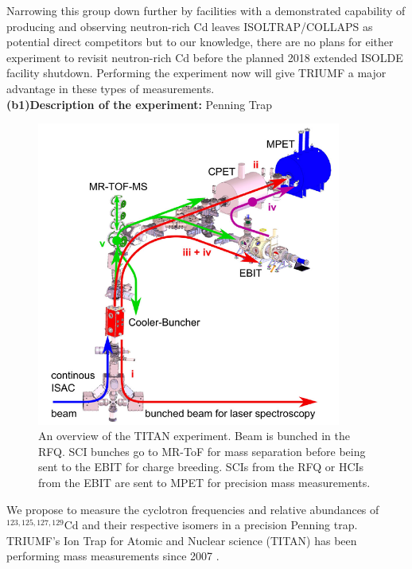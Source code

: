 \documentclass[12pt]{article}
\begin{document}
Narrowing this group down further by facilities with a demonstrated capability of producing and observing neutron-rich Cd leaves ISOLTRAP/COLLAPS as potential direct competitors but to our knowledge, there are no plans for either experiment to revisit neutron-rich Cd before the planned 2018 extended ISOLDE facility shutdown. Performing the experiment now will give TRIUMF a major advantage in these types of measurements.\\

\noindent\textbf{(b1)Description of the experiment:} Penning Trap

\begin{figure}[ht]
    \begin{center}
        \includegraphics[width=10cm]{TITAN_MRTOF.png}
        \caption[The TITAN experiment]{An overview of the TITAN experiment. Beam is bunched in the RFQ. SCI bunches go to MR-ToF for mass separation before being sent to the EBIT for charge breeding. SCIs from the RFQ or HCIs from the EBIT are sent to MPET for precision mass measurements.}
        \label{fig:TITAN}
    \end{center}
\end{figure}
We propose to measure the cyclotron frequencies and relative abundances of $^{123,125,127,129}$Cd and their respective isomers in a precision Penning trap. TRIUMF's Ion Trap for Atomic and Nuclear science (TITAN) has been performing mass measurements since 2007 \cite{Dilling2003,Dilling2006,Ettenauer2010,Gallant2012}.
\end{document}

